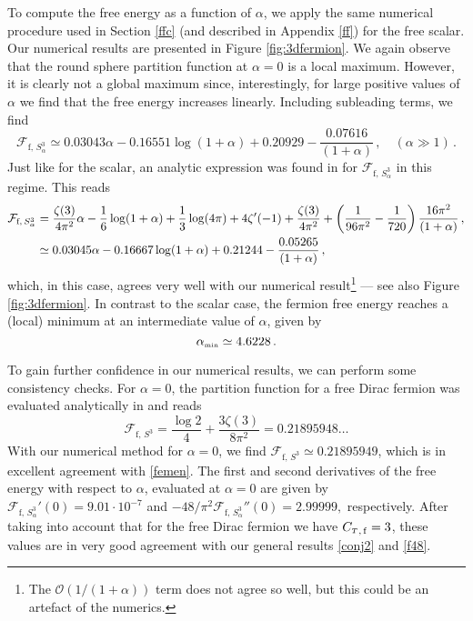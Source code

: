 \documentclass[12pt]{article}
\numberwithin{equation}{section}
\newcommand{\ssc}{\scriptscriptstyle}
\newcommand{\ctt}{C_{\ssc T}}
\begin{document}
To compute the free energy as a function of $\alpha$, we apply the same numerical procedure used in Section \ref{ffc} (and described in Appendix \ref{ff}) for the free scalar. Our numerical results are presented in Figure \ref{fig:3dfermion}. We again observe that the round sphere partition function at $\alpha=0$ is a local maximum. However, it is clearly not a global maximum since, interestingly, for large positive values of $\alpha$ we find that the free energy  increases linearly. Including subleading terms, we find 
%
\begin{equation}\label{line}
\mathcal{F}_{\textrm{f},\,S^3_\alpha}\simeq 0.03043 \alpha-0.16551\log(1+\alpha)+0.20929-\frac{0.07616}{(1+\alpha)}\, , \quad (\alpha \gg 1)\, .
\end{equation}
%
Just like for the scalar, an analytic expression was found in \cite{DeFrancia:2000xm} for $\mathcal{F}_{\textrm{f},\,S^3_\alpha}$ in this regime. This reads
%
\begin{align}\label{dow}
\mathcal{F}_{\textrm{f},\,S^3_\alpha}&= \frac{\zeta(3)}{4\pi^2} \alpha -\frac{1}{6}\log(1+\alpha)+\frac{1}{3}\log(4\pi)+4\zeta'(-1)+\frac{\zeta(3)}{4\pi^2}+\left(\frac{1}{96\pi^2} -\frac{1}{720}\right)\frac{16\pi^2}{(1+\alpha)}\, ,\\ 
\notag
&\simeq 0.03045 \alpha-0.16667\log(1+\alpha)+0.21244-\frac{0.05265}{(1+\alpha)}\, ,
\end{align}
%
which, in this case, agrees very well with our numerical result\footnote{The $\mathcal{O}(1/(1+\alpha))$ term does not agree so well, but this could be an artefact of the numerics.  } --- see also Figure \ref{fig:3dfermion}.
%
In contrast to the scalar case, the fermion free energy reaches a (local) minimum at an intermediate value of $\alpha$, given by
%
\begin{equation}\label{alphamin}
\alpha_{\rm \ssc min}\simeq 4.6228\, .
\end{equation}
%


To gain further confidence in our numerical results, we can perform some consistency checks. For $\alpha=0$, the partition function for a free Dirac fermion was evaluated analytically in \cite{Klebanov:2011gs} and reads
%
\begin{equation}\label{femen}
\mathcal{F}_{\textrm{f},\,S^3} = \frac{\log{2}}{4}  + \frac{3 \zeta(3)}{8 \pi^2}=0.21895948\dots
\end{equation}
%
With our numerical method for $\alpha=0$, we find $\mathcal{F}_{\textrm{f},\,S^3}\simeq 0.21895949$, which is in excellent agreement with \eqref{femen}. The first and second derivatives of the free energy with respect to $\alpha$, evaluated at $\alpha=0$ are given by 
$
\mathcal{F}_{\textrm{f},\,S^3_\alpha}'(0) = 9.01 \cdot 10^{-7}$ and $   -48/\pi^2 \mathcal{F}_{\textrm{f},\,S^3_\alpha}''(0)=  2.99999 ,
$ respectively. After taking into account that for the free Dirac fermion we have  ${\ctt}_{, \,\rm f}=3$, these values are in very good agreement with our general results \eqref{conj2} and \eqref{f48}. 
\end{document}
